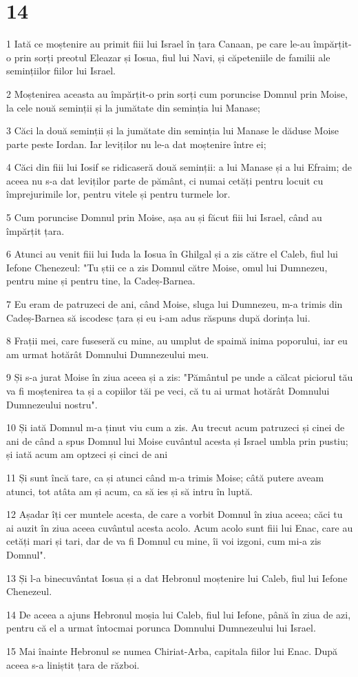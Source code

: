 \chapter{14}

\par 1 Iată ce moștenire au primit fiii lui Israel în țara Canaan, pe care le-au împărțit-o prin sorți preotul Eleazar și Iosua, fiul lui Navi, și căpeteniile de familii ale semințiilor fiilor lui Israel.
\par 2 Moștenirea aceasta au împărțit-o prin sorți cum poruncise Domnul prin Moise, la cele nouă seminții și la jumătate din seminția lui Manase;
\par 3 Căci la două seminții și la jumătate din seminția lui Manase le dăduse Moise parte peste Iordan. Iar leviților nu le-a dat moștenire între ei;
\par 4 Căci din fiii lui Iosif se ridicaseră două seminții: a lui Manase și a lui Efraim; de aceea nu s-a dat leviților parte de pământ, ci numai cetăți pentru locuit cu împrejurimile lor, pentru vitele și pentru turmele lor.
\par 5 Cum poruncise Domnul prin Moise, așa au și făcut fiii lui Israel, când au împărțit țara.
\par 6 Atunci au venit fiii lui Iuda la Iosua în Ghilgal și a zis către el Caleb, fiul lui Iefone Chenezeul: "Tu știi ce a zis Domnul către Moise, omul lui Dumnezeu, pentru mine și pentru tine, la Cadeș-Barnea.
\par 7 Eu eram de patruzeci de ani, când Moise, sluga lui Dumnezeu, m-a trimis din Cadeș-Barnea să iscodesc țara și eu i-am adus răspuns după dorința lui.
\par 8 Frații mei, care fuseseră cu mine, au umplut de spaimă inima poporului, iar eu am urmat hotărât Domnului Dumnezeului meu.
\par 9 Și s-a jurat Moise în ziua aceea și a zis: "Pământul pe unde a călcat piciorul tău va fi moștenirea ta și a copiilor tăi pe veci, că tu ai urmat hotărât Domnului Dumnezeului nostru".
\par 10 Și iată Domnul m-a ținut viu cum a zis. Au trecut acum patruzeci și cinei de ani de când a spus Domnul lui Moise cuvântul acesta și Israel umbla prin pustiu; și iată acum am optzeci și cinci de ani
\par 11 Și sunt încă tare, ca și atunci când m-a trimis Moise; câtă putere aveam atunci, tot atâta am și acum, ca să ies și să intru în luptă.
\par 12 Așadar îți cer muntele acesta, de care a vorbit Domnul în ziua aceea; căci tu ai auzit în ziua aceea cuvântul acesta acolo. Acum acolo sunt fiii lui Enac, care au cetăți mari și tari, dar de va fi Domnul cu mine, îi voi izgoni, cum mi-a zis Domnul".
\par 13 Și l-a binecuvântat Iosua și a dat Hebronul moștenire lui Caleb, fiul lui Iefone Chenezeul.
\par 14 De aceea a ajuns Hebronul moșia lui Caleb, fiul lui Iefone, până în ziua de azi, pentru că el a urmat întocmai porunca Domnului Dumnezeului lui Israel.
\par 15 Mai înainte Hebronul se numea Chiriat-Arba, capitala fiilor lui Enac. După aceea s-a liniștit țara de război.

